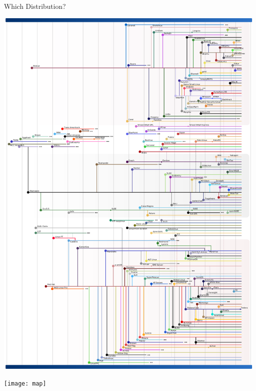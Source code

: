 \begin{frame}{Which Distribution?}
  \begin{minipage}{.35\linewidth}
    \includegraphics[width=\textwidth]{Gldt}
  \end{minipage}\quad
  \begin{minipage}{.55\linewidth}
    \texttt{[image: map]}
  \end{minipage}
\end{frame}




